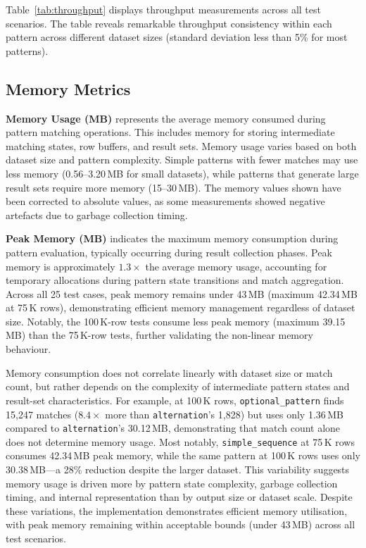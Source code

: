 Table~\ref{tab:throughput} displays throughput measurements across
all test scenarios.  The table reveals remarkable throughput
consistency within each pattern across different dataset sizes
(standard deviation less than 5\% for most patterns).

\subsection{Memory Metrics}
\label{subsec:eval-memory}

\noindent\textbf{Memory Usage (MB)} represents the average memory
consumed during pattern matching operations.  This includes memory
for storing intermediate matching states, row buffers, and result
sets.  Memory usage varies based on both dataset size and pattern
complexity.  Simple patterns with fewer matches may use less memory
(0.56--3.20\,MB for small datasets), while patterns that generate
large result sets require more memory (15--30\,MB).  The memory
values shown have been corrected to absolute values, as some
measurements showed negative artefacts due to garbage collection
timing.

\noindent\textbf{Peak Memory (MB)} indicates the maximum memory
consumption during pattern evaluation, typically occurring during
result collection phases.  Peak memory is approximately $1.3\times$
the average memory usage, accounting for temporary allocations during
pattern state transitions and match aggregation.  Across all 25 test
cases, peak memory remains under 43\,MB (maximum 42.34\,MB at 75\,K
rows), demonstrating efficient memory management regardless of
dataset size.  Notably, the 100\,K-row tests consume less peak memory
(maximum 39.15\,MB) than the 75\,K-row tests, further validating the
non-linear memory behaviour.

Memory consumption does not correlate linearly with dataset size or
match count, but rather depends on the complexity of intermediate
pattern states and result-set characteristics.  For example, at
100\,K rows, \texttt{optional\_pattern} finds 15{,}247 matches
($8.4\times$ more than \texttt{alternation}'s 1{,}828) but uses only
1.36\,MB compared to \texttt{alternation}'s 30.12\,MB, demonstrating
that match count alone does not determine memory usage.  Most
notably, \texttt{simple\_sequence} at 75\,K rows consumes
42.34\,MB peak memory, while the same pattern at 100\,K rows uses
only 30.38\,MB---a 28\% reduction despite the larger dataset.  This
variability suggests memory usage is driven more by pattern state
complexity, garbage collection timing, and internal representation
than by output size or dataset scale.  Despite these variations, the
implementation demonstrates efficient memory utilisation, with peak
memory remaining within acceptable bounds (under 43\,MB) across all
test scenarios.

